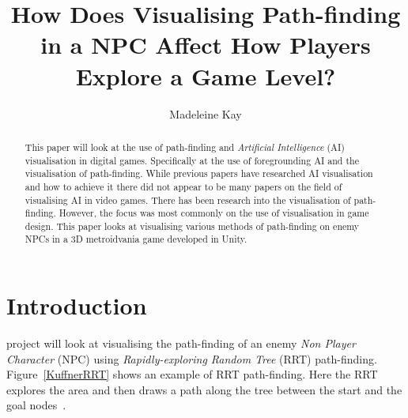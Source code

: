 \documentclass[journal]{IEEEtran}
\begin{document}
%
\title{ How Does Visualising Path-finding in a NPC Affect How Players Explore a Game Level?}
%
%
\author{Madeleine Kay}


\maketitle

\begin{abstract}
	This paper will look at the use of path-finding and \textit{Artificial Intelligence} (AI) visualisation in digital games.   Specifically at the use of foregrounding AI and the visualisation of path-finding. 
While previous papers have researched AI visualisation and how to achieve it there did not appear to be many papers on the field of visualising AI in video games. There has been research into the visualisation of path-finding. However, the focus was most commonly on the use of visualisation in game design. 
	This paper looks at visualising various methods of path-finding on enemy NPCs in a 3D metroidvania game developed in Unity.\\

\end{abstract}

\section{Introduction} \label{introduction}
 project will look at visualising the path-finding of an enemy \textit{Non Player Character} (NPC) using \textit{Rapidly-exploring Random Tree} (RRT) path-finding.  Figure~\ref{KuffnerRRT} shows an example of RRT path-finding. Here the RRT explores the area and then draws a path along the tree between the start and the goal nodes~\cite{Kuffner2000}. 
\end{document}

